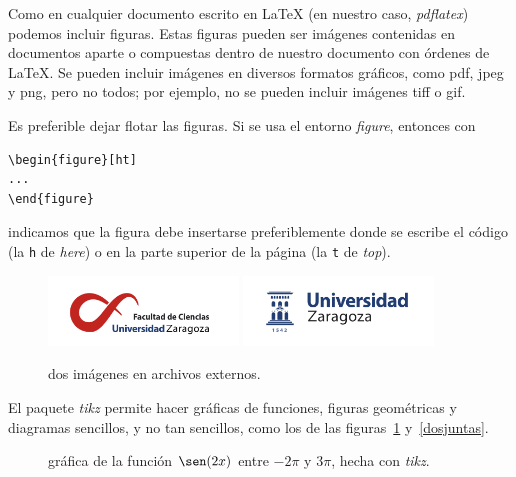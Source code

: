 \documentclass[11pt]{book}
\theoremstyle{plain} %
\theoremstyle{definition} %
\begin{document}
Como en cualquier documento escrito en {\LaTeX} (en nuestro caso, 
\emph{pdflatex}) podemos incluir figuras. Estas figuras pueden ser imágenes 
contenidas en documentos aparte o compuestas dentro de nuestro documento con 
órdenes de \LaTeX. Se pueden incluir imágenes en diversos formatos 
gráficos, como pdf, jpeg y png, pero no todos; por 
ejemplo, no se pueden incluir imágenes tiff o gif.

Es preferible dejar flotar las figuras. Si se usa el entorno \emph{figure}, 
entonces con
\begin{verbatim}
\begin{figure}[ht]
...
\end{figure}
\end{verbatim}
indicamos que la figura debe insertarse preferiblemente donde se escribe el 
código (la \texttt{h} de \emph{here}) o en la parte superior de la página (la 
\texttt{t} de \emph{top}).

\begin{figure}[ht]%
\centering
\includegraphics[width=0.45\textwidth]{ciencias.png}
\qquad
\includegraphics[width=0.45\textwidth]{logoUZ.png}
\caption{dos imágenes en archivos externos.}
\end{figure}

El paquete \emph{tikz} permite hacer gráficas de funciones, 
figuras geométricas y diagramas sencillos, y no tan sencillos, como los de las 
figuras~\ref{graf-seno} y~\ref{dosjuntas}.

\begin{figure}[ht]%
\centering
\caption{gráfica de la función $\sen(2x)$ entre $-2\pi$ y $3\pi$, hecha con \emph{tikz}.}
\label{graf-seno}
\end{figure}
\end{document}
